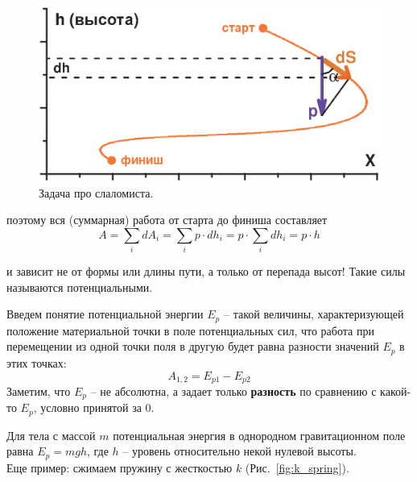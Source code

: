 \begin{figure}[ht]
\centering
\includegraphics{GP004/GP004F05.eps}


  \caption{\sf\Large Задача про слаломиста.}
   \label{fig:slalom_task}
\end{figure}

поэтому вся (суммарная) работа от старта до финиша составляет
   \begin{displaymath}
   A=\sum_idA_i=\sum_ip\cdot dh_i=p\cdot\sum_idh_i=p\cdot h
   \end{displaymath}

и зависит не от формы или длины пути, а только от перепада высот! Такие силы называются потенциальными.

Введем понятие потенциальной энергии $E_p$ -- такой величины, характери\-зующей положение материальной точки в поле потенциальных сил, что работа при перемещении из одной точки поля в другую будет равна разности значений $E_{p}$ в этих точках:
   \begin{displaymath}
   A_{1,2}=E_{p1}-E_{p2}
   \end{displaymath}
Заметим, что $E_p$ -- не абсолютна, а задает только {\bf разность} по сравнению с какой-то $E_p$, условно принятой за 0.

Для тела с массой $m$ потенциальная энергия в однородном гравитационном поле равна $E_p=mgh$, где $h$ -- уровень относительно некой нулевой высоты.\\

Еще пример: сжимаем пружину с жесткостью $k$ (Рис.~\ref{fig:k_spring}).\\

